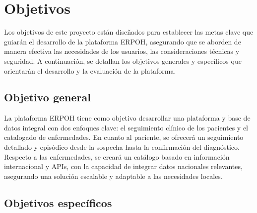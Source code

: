\documentclass{article}
\begin{document}
\section{Objetivos}

Los objetivos de este proyecto están diseñados para establecer las metas clave que guiarán el desarrollo de la plataforma ERPOH, asegurando que se aborden de manera efectiva las necesidades de los usuarios, las consideraciones técnicas y seguridad. A continuación, se detallan los objetivos generales y específicos que orientarán el desarrollo y la evaluación de la plataforma.

\subsection{Objetivo general}

La plataforma ERPOH tiene como objetivo desarrollar una plataforma y base de datos integral con dos enfoques clave: el seguimiento clínico de los pacientes y el catalogado de enfermedades. En cuanto al paciente, se ofrecerá un seguimiento detallado y episódico desde la sospecha hasta la confirmación del diagnóstico. Respecto a las enfermedades, se creará un catálogo basado en información internacional y APIs, con la capacidad de integrar datos nacionales relevantes, asegurando una solución escalable y adaptable a las necesidades locales.

\subsection{Objetivos específicos}
\end{document}
